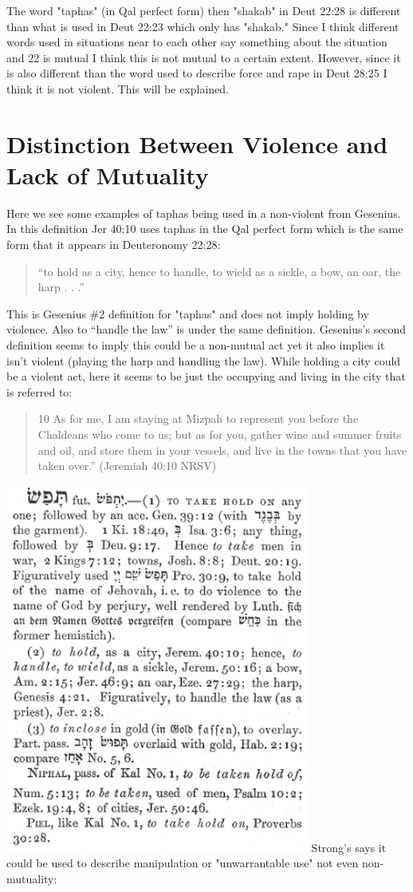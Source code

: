 \documentclass[11pt]{article}
\begin{document}
The word "taphas" (in Qal perfect form) then "shakab" in Deut 22:28 is different than what is used in Deut 22:23 which only has "shakab." Since I think different words used in situations near to each other say something about the situation and 22 is mutual I think this is not mutual to a certain extent. However, since it is also different than the word used to describe force and rape in Deut 28:25 I think it is not violent. This will be explained. 

\section{Distinction Between Violence and Lack of Mutuality}
Here we see some examples of taphas being used in a non-violent from Gesenius. In this definition Jer 40:10 uses taphas in the Qal perfect form which is the same form that it appears in Deuteronomy 22:28:
\begin{quote}
“to hold as a city, hence to handle, to wield as a sickle, a bow, an oar, the harp . . .” 
\end{quote}
This is Gesenius \#2 definition for "taphas" and does not imply holding by violence. Also to “handle the law” is under the same definition. Gesenius’s second definition seems to imply this could be a non-mutual act yet it also implies it isn't violent (playing the harp and handling the law). While holding a city could be a violent act, here it seems to be just the occupying and living in the city that is referred to:
\begin{quote}
10 As for me, I am staying at Mizpah to represent you before the Chaldeans who come to us; but as for you, gather wine and summer fruits and oil, and store them in your vessels, and live in the towns that you have taken over.” (Jeremiah 40:10 NRSV)
\end{quote}

\includegraphics[width=10cm]{taphas}
\newline
Strong’s says it could be used to describe manipulation or "unwarrantable use" not even non-mutuality:
\end{document}

